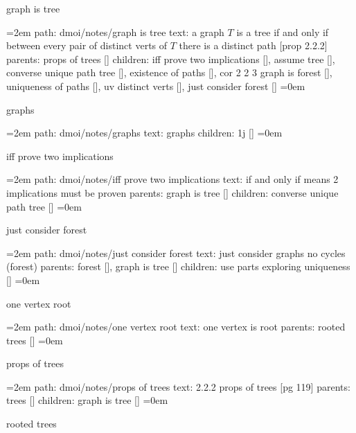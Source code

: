 \par\endgroup
\bigskip
{}
graph is tree
\smallskip
\par\begingroup
\leftskip=2em
path: dmoi/notes/graph is tree
\smallskip
text:  a graph $T$ is a tree if and only if between every pair of distinct verts of $T$ there is a distinct path [prop 2.2.2]
\smallskip
parents:  props of trees []
\smallskip
children: iff prove two implications [], assume tree [], converse unique path tree [], existence of paths [], cor 2 2 3 graph is forest [], uniqueness of paths [], uv distinct verts [], just consider forest []
\smallskip
\leftskip=0em
\par\endgroup
\bigskip
{}
graphs
\smallskip
\par\begingroup
\leftskip=2em
path: dmoi/notes/graphs
\smallskip
text:  graphs
\smallskip
children: 1j []
\smallskip
\leftskip=0em
\par\endgroup
\bigskip
{}
iff prove two implications
\smallskip
\par\begingroup
\leftskip=2em
path: dmoi/notes/iff prove two implications
\smallskip
text:  if and only if means 2 implications must be proven
\smallskip
parents:  graph is tree []
\smallskip
children: converse unique path tree []
\smallskip
\leftskip=0em
\par\endgroup
\bigskip
{}
just consider forest
\smallskip
\par\begingroup
\leftskip=2em
path: dmoi/notes/just consider forest
\smallskip
text:  just consider graphs no cycles (forest)
\smallskip
parents:  forest [], graph is tree []
\smallskip
children: use parts exploring uniqueness []
\smallskip
\leftskip=0em
\par\endgroup
\bigskip
{}
one vertex root
\smallskip
\par\begingroup
\leftskip=2em
path: dmoi/notes/one vertex root
\smallskip
text:  one vertex is root
\smallskip
parents:  rooted trees []
\smallskip
\leftskip=0em
\par\endgroup
\bigskip
{}
props of trees
\smallskip
\par\begingroup
\leftskip=2em
path: dmoi/notes/props of trees
\smallskip
text:  2.2.2 props of trees [pg 119]
\smallskip
parents:  trees []
\smallskip
children: graph is tree []
\smallskip
\leftskip=0em
\par\endgroup
\bigskip
{}
rooted trees

